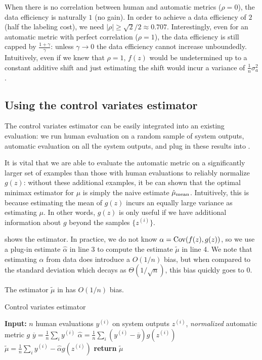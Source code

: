 When there is no correlation between human and automatic metrics ($\rho = 0$),
the data efficiency is naturally $1$ (no gain).
In order to achieve a data efficiency of
$2$ (half the labeling cost), we need $|\rho| \geq \sqrt{2}/2 \approx 0.707$.
Interestingly, even for an automatic metric with perfect correlation ($\rho=1$),
the data efficiency is still capped by $\frac{1 + \gamma}{\gamma}$:
unless $\gamma \to 0$ the data efficiency cannot increase unboundedly.
Intuitively, even
if we knew that $\rho=1$, $f(z)$ would be undetermined up to a
constant additive shift and just estimating the shift would incur a variance of $\frac{1}{n} \sigma_a^2$.




\subsection{Using the control variates estimator}
The control variates estimator can be easily integrated into an existing evaluation:
we run human evaluation on a random sample of system outputs, automatic evaluation on all the system outputs, and plug in these results into .

It is vital that we are able to evaluate the automatic metric on a significantly larger set of examples than those with human evaluations to reliably normalize $g(z)$:
without these additional examples, it be can shown that the optimal minimax estimator for $\mu$ is simply the naive estimate $\hat \mu_\text{mean}$.
Intuitively, this is because estimating the mean of $g(z)$ incurs an equally large variance as estimating $\mu$.
In other words, $g(z)$ is only useful if we have additional information about $g$ beyond the samples $\{z^{(i)}\}$.

 shows the estimator.
In practice, we do not know $\alpha = \operatorname{Cov}(f(z),g(z))$, so we use a plug-in estimate $\hat{\alpha}$ in line 3 to compute the estimate $\widetilde{\mu}$ in line 4.
We note that estimating $\alpha$ from data does introduce a $O(1/n)$ bias,
but when compared to the standard deviation which decays as $\Theta(1/\sqrt{n})$, this bias quickly goes to $0$.

\begin{proposition}
\label{prop:added_bias}
The estimator $\widetilde{\mu}$ in  has $O(1/n)$ bias.
\end{proposition}

\begin{algorithm}
      \caption{\label{alg:estimate}Control variates estimator}
      \begin{algorithmic}[1]
   \STATE{} {\bfseries Input:} $n$ human evaluations $y^{(i)}$ on system outputs $z^{(i)}$, \textit{normalized} automatic metric $g$ 
   \STATE{} $\overline{y} = \frac{1}{n} \sum_i y^{(i)}$
   \STATE{} $\hat{\alpha} = \frac{1}{n} \sum_i (y^{(i)} - \overline{y}) g(z^{(i)})$
   \STATE{} $\widetilde{\mu} = \frac{1}{n} \sum_i y^{(i)} - \hat{\alpha} g(z^{(i)})$
   \STATE{} {\bfseries return} $\widetilde{\mu}$
\end{algorithmic}
\end{algorithm}

